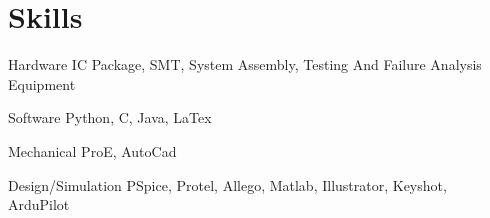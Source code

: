 \documentclass[12pt,a4paper]{report}
\begin{document}
    \section*{Skills}
    \begin{tablist}
        \item[Hardware] \tab{}IC Package, SMT, System Assembly, Testing And Failure Analysis Equipment 
        \item[Software] \tab{}\tab{}Python, C, Java, LaTex
        \item[Mechanical] \tab{}ProE, AutoCad
        \item[Design/Simulation] \tab{}PSpice, Protel, Allego, Matlab, Illustrator, Keyshot, ArduPilot
    \end{tablist}
\end{document}
